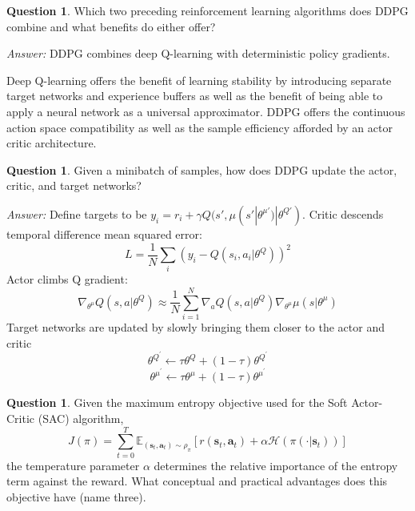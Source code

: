 \documentclass{article}
\theoremstyle{definition}
\newtheorem{question}[thm]{Question}
\newenvironment{answer}{\noindent\textit{Answer:}}{}
\begin{document}
\begin{question}
Which two preceding reinforcement learning algorithms does DDPG combine and what benefits do either offer?
\end{question}

\begin{answer}
DDPG combines deep Q-learning with deterministic policy gradients.

Deep Q-learning offers the benefit of learning stability by introducing separate target networks and experience buffers as well as the benefit of being able to apply a neural network as a universal approximator. DDPG offers the continuous action space compatibility as well as the sample efficiency afforded by an actor critic architecture.
\end{answer}

\begin{question} 
Given a minibatch of samples, how does DDPG update the actor, critic, and target networks?
\end{question}

\begin{answer}
Define targets to be $y_i = r_i + \gamma Q(s', \mu(s'|\theta^{\mu'})|\theta^{Q'})$.
Critic descends temporal difference mean squared error: 
$$L = \frac{1}{N}\sum_i(y_i - Q(s_i, a_i|\theta^{Q}))^2$$
Actor climbs Q gradient: 
$$\nabla_{\theta^\mu}Q(s,a|\theta^Q) \approx \frac{1}{N}\sum_{i=1}^N \nabla_{a}Q(s,a|\theta^Q)\nabla_{\theta^\mu}\mu(s|\theta^\mu)$$
Target networks are updated by slowly bringing them closer to the actor and critic
$$\theta^{Q^{\prime}} \leftarrow \tau \theta^{Q}+(1-\tau) \theta^{Q^{\prime}} $$
$$\theta^{\mu^{\prime}} \leftarrow \tau \theta^{\mu}+(1-\tau) \theta^{\mu^{\prime}}$$
\end{answer}

\begin{question}
Given the maximum entropy objective used for the Soft Actor-Critic (SAC) algorithm,
\begin{equation}
    J(\pi) = \sum_{t=0}^{T} \mathbb{E}_{(\mathbf{s}_{t}, \mathbf{a}_{t})\sim \rho_{\pi}} [r(\mathbf{s}_{t}, \mathbf{a}_{t}) + \alpha \mathcal{H}(\pi (\cdot{} | \mathbf{s}_{t}))]
\end{equation}
the temperature parameter $\alpha$ determines the relative importance of the entropy term against the reward. What conceptual and practical advantages does this objective have (name three).
\end{question}
\end{document}
